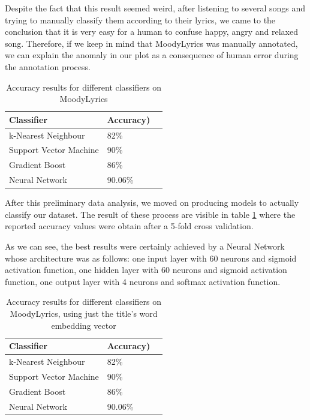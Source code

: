 Despite the fact that this result seemed weird, after listening to several songs and trying to
manually classify them according to their lyrics, we came to the conclusion that it is very
easy for a human to confuse happy, angry and relaxed song. Therefore, if we keep in mind that
MoodyLyrics was manually annotated, we can explain the anomaly in our plot as a consequence
of human error during the annotation process.

\begin{table}[]
\centering
\begin{tabular}{@{}lll@{}}
\toprule
\textbf{Classifier} & \textbf{Accuracy})   \\ \midrule
k-Nearest Neighbour & 82\%  \\
Support Vector Machine & 90\%  \\
Gradient Boost & 86\%  \\
Neural Network & 90.06\%  \\
\end{tabular}
\caption{Accuracy results for different classifiers on MoodyLyrics}
\label{table:ml-simple-results}
\end{table}

After this preliminary data analysis, we moved on producing models to actually classify our dataset.
The result of these process are visible in table \ref{table:ml-simple-results} where the reported
accuracy values were obtain after a 5-fold cross validation.

As we can see, the best results were certainly achieved by a Neural Network whose architecture was
as follows: one input layer with 60 neurons and sigmoid activation function, one hidden layer with
60 neurons and sigmoid activation function, one output layer with 4 neurons and softmax activation
function.

\begin{table}[]
\centering
\begin{tabular}{@{}lll@{}}
\toprule
\textbf{Classifier} & \textbf{Accuracy})   \\ \midrule
k-Nearest Neighbour & 82\%  \\
Support Vector Machine & 90\%  \\
Gradient Boost & 86\%  \\
Neural Network & 90.06\%  \\
\end{tabular}
\caption{Accuracy results for different classifiers on MoodyLyrics, using just the title's word embedding vector}
\label{table:ml-simple-results-title}
\end{table}

